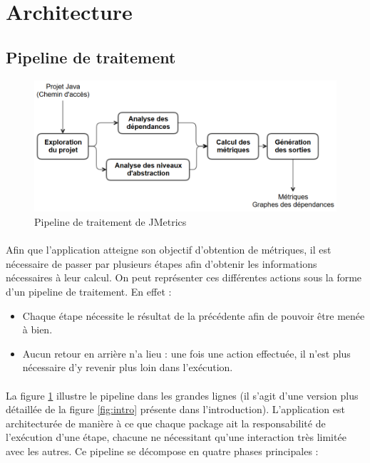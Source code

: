 \documentclass{scrartcl}
\begin{document}
\newpage
\section{Architecture}
\subsection{Pipeline de traitement}

\begin{figure}[ht]
    \centering
    \includegraphics[width=\textwidth]{img/SimplifiedPipeline.png}    \caption{Pipeline de traitement de JMetrics}
    \label{fig:simplepipe}
\end{figure}

    \paragraph{}Afin que l'application atteigne son objectif d'obtention de métriques, il est nécessaire de passer par plusieurs étapes afin d'obtenir les informations nécessaires à leur calcul. On peut représenter ces différentes actions sous la forme d'un pipeline de traitement. En effet :

\begin{itemize}
	\item Chaque étape nécessite le résultat de la précédente afin de pouvoir être menée à bien.
	\item Aucun retour en arrière n'a lieu : une fois une action effectuée, il n'est plus nécessaire d'y revenir plus loin dans l'exécution.
\end{itemize}

    \paragraph{}La figure \ref{fig:simplepipe} illustre le pipeline dans les grandes lignes (il s'agit d'une version plus détaillée de la figure \ref{fig:intro} présente dans l'introduction). L'application est architecturée de manière à ce que chaque package ait la responsabilité de l'exécution d'une étape, chacune ne nécessitant qu'une interaction très limitée avec les autres. Ce pipeline se décompose en quatre phases principales :
\end{document}
